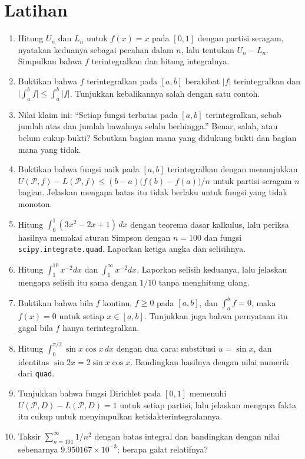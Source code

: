 \section{Latihan}

\begin{latihan}
\begin{enumerate}
  \item Hitung $U_n$ dan $L_n$ untuk $f(x)=x$ pada $[0,1]$ dengan partisi seragam,
        nyatakan keduanya sebagai pecahan dalam $n$, lalu tentukan $U_n-L_n$. Simpulkan
        bahwa $f$ terintegralkan dan hitung integralnya.
  \item Buktikan bahwa $f$ terintegralkan pada $[a,b]$ berakibat $|f|$ terintegralkan
        dan $\bigl|\int_a^bf\bigr|\le\int_a^b|f|$. Tunjukkan kebalikannya salah dengan
        satu contoh.
  \item Nilai klaim ini: ``Setiap fungsi terbatas pada $[a,b]$ terintegralkan, sebab
        jumlah atas dan jumlah bawahnya selalu berhingga.'' Benar, salah, atau belum
        cukup bukti? Sebutkan bagian mana yang didukung bukti dan bagian mana yang
        tidak.
  \item Buktikan bahwa fungsi naik pada $[a,b]$ terintegralkan dengan menunjukkan
        $U(\mathcal{P},f)-L(\mathcal{P},f)\le(b-a)\bigl(f(b)-f(a)\bigr)/n$ untuk
        partisi seragam $n$ bagian. Jelaskan mengapa batas itu tidak berlaku untuk
        fungsi yang tidak monoton.
  \item Hitung $\int_0^1(3x^2-2x+1)\,dx$ dengan teorema dasar kalkulus, lalu periksa
        hasilnya memakai aturan Simpson dengan $n=100$ dan fungsi
        \texttt{scipy.integrate.quad}. Laporkan ketiga angka dan selisihnya.
  \item Hitung $\int_1^{10}x^{-2}dx$ dan $\int_1^{\infty}x^{-2}dx$. Laporkan selisih
        keduanya, lalu jelaskan mengapa selisih itu sama dengan $1/10$ tanpa
        menghitung ulang.
  \item Buktikan bahwa bila $f$ kontinu, $f\ge0$ pada $[a,b]$, dan $\int_a^bf=0$, maka
        $f(x)=0$ untuk setiap $x\in[a,b]$. Tunjukkan juga bahwa pernyataan itu gagal
        bila $f$ hanya terintegralkan.
  \item Hitung $\int_0^{\pi/2}\sin x\cos x\,dx$ dengan dua cara: substitusi
        $u=\sin x$, dan identitas $\sin2x=2\sin x\cos x$. Bandingkan hasilnya dengan
        nilai numerik dari \texttt{quad}.
  \item Tunjukkan bahwa fungsi Dirichlet pada $[0,1]$ memenuhi
        $U(\mathcal{P},D)-L(\mathcal{P},D)=1$ untuk setiap partisi, lalu jelaskan
        mengapa fakta itu cukup untuk menyimpulkan ketidakterintegralannya.
  \item Taksir $\sum_{n=101}^{\infty}1/n^2$ dengan batas integral dan bandingkan dengan
        nilai sebenarnya $9.950167\times10^{-3}$; berapa galat relatifnya?
\end{enumerate}


\end{latihan}
